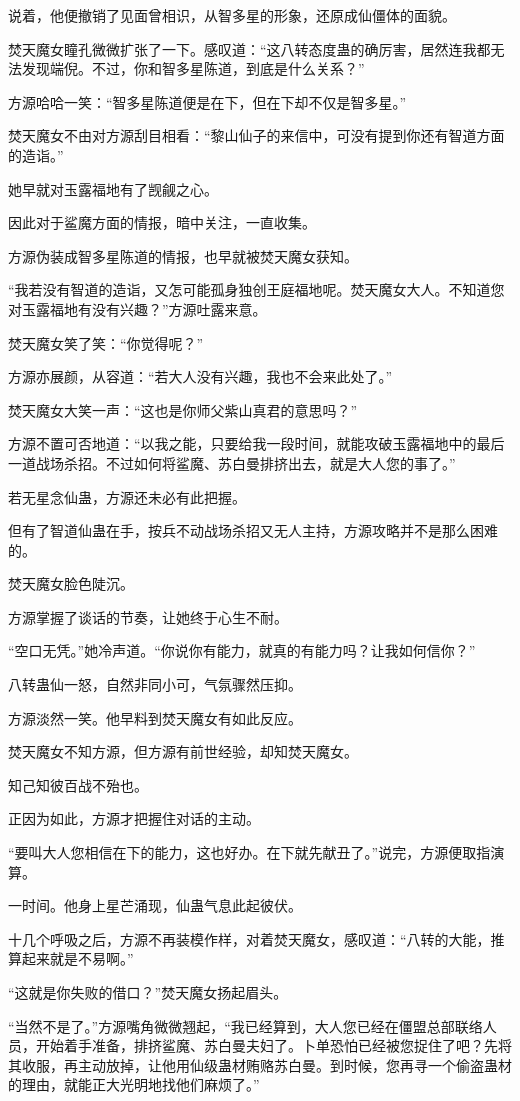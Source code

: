 \begin{this_body}
说着，他便撤销了见面曾相识，从智多星的形象，还原成仙僵体的面貌。

焚天魔女瞳孔微微扩张了一下。感叹道：“这八转态度蛊的确厉害，居然连我都无法发现端倪。不过，你和智多星陈道，到底是什么关系？”

方源哈哈一笑：“智多星陈道便是在下，但在下却不仅是智多星。”

焚天魔女不由对方源刮目相看：“黎山仙子的来信中，可没有提到你还有智道方面的造诣。”

她早就对玉露福地有了觊觎之心。

因此对于鲨魔方面的情报，暗中关注，一直收集。

方源伪装成智多星陈道的情报，也早就被焚天魔女获知。

“我若没有智道的造诣，又怎可能孤身独创王庭福地呢。焚天魔女大人。不知道您对玉露福地有没有兴趣？”方源吐露来意。

焚天魔女笑了笑：“你觉得呢？”

方源亦展颜，从容道：“若大人没有兴趣，我也不会来此处了。”

焚天魔女大笑一声：“这也是你师父紫山真君的意思吗？”

方源不置可否地道：“以我之能，只要给我一段时间，就能攻破玉露福地中的最后一道战场杀招。不过如何将鲨魔、苏白曼排挤出去，就是大人您的事了。”

若无星念仙蛊，方源还未必有此把握。

但有了智道仙蛊在手，按兵不动战场杀招又无人主持，方源攻略并不是那么困难的。

焚天魔女脸色陡沉。

方源掌握了谈话的节奏，让她终于心生不耐。

“空口无凭。”她冷声道。“你说你有能力，就真的有能力吗？让我如何信你？”

八转蛊仙一怒，自然非同小可，气氛骤然压抑。

方源淡然一笑。他早料到焚天魔女有如此反应。

焚天魔女不知方源，但方源有前世经验，却知焚天魔女。

知己知彼百战不殆也。

正因为如此，方源才把握住对话的主动。

“要叫大人您相信在下的能力，这也好办。在下就先献丑了。”说完，方源便取指演算。

一时间。他身上星芒涌现，仙蛊气息此起彼伏。

十几个呼吸之后，方源不再装模作样，对着焚天魔女，感叹道：“八转的大能，推算起来就是不易啊。”

“这就是你失败的借口？”焚天魔女扬起眉头。

“当然不是了。”方源嘴角微微翘起，“我已经算到，大人您已经在僵盟总部联络人员，开始着手准备，排挤鲨魔、苏白曼夫妇了。卜单恐怕已经被您捉住了吧？先将其收服，再主动放掉，让他用仙级蛊材贿赂苏白曼。到时候，您再寻一个偷盗蛊材的理由，就能正大光明地找他们麻烦了。”


\end{this_body}
